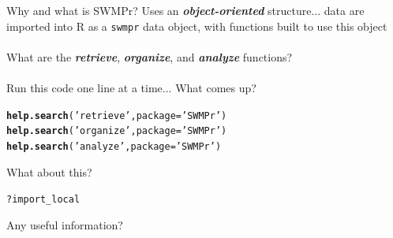 \documentclass[xcolor=dvipsnames]{beamer}\usepackage[]{graphicx}\usepackage[]{color}
\makeatletter
\newcommand{\hlstr}[1]{\textcolor[rgb]{0.192,0.494,0.8}{#1}}%
\newcommand{\hlopt}[1]{\textcolor[rgb]{0,0,0}{#1}}%
\newcommand{\hlstd}[1]{\textcolor[rgb]{0.345,0.345,0.345}{#1}}%
\newcommand{\hlkwc}[1]{\textcolor[rgb]{0.333,0.667,0.333}{#1}}%
\newcommand{\hlkwd}[1]{\textcolor[rgb]{0.737,0.353,0.396}{\textbf{#1}}}%
\newenvironment{kframe}{%
 \def\at@end@of@kframe{}%
 \ifinner\ifhmode%
  \def\at@end@of@kframe{\end{minipage}}%
  \begin{minipage}{\columnwidth}%
 \fi\fi%
 \def\FrameCommand##1{\hskip\@totalleftmargin \hskip-\fboxsep
 \colorbox{shadecolor}{##1}\hskip-\fboxsep
     \hskip-\linewidth \hskip-\@totalleftmargin \hskip\columnwidth}%
 \MakeFramed {\advance\hsize-\width
   \@totalleftmargin\z@ \linewidth\hsize
   \@setminipage}}%
 {\par\unskip\endMakeFramed%
 \at@end@of@kframe}
\newenvironment{knitrout}{}{} %
\newcommand{\Bigtxt}[1]{\textbf{\textit{#1}}}
\makeatother
\begin{document}
\begin{frame}[fragile]{Why and what is SWMPr?}
\onslide<+->
Uses an \Bigtxt{object-oriented} structure... data are imported into R as a \texttt{swmpr} data object, with functions built to use this object\\~\\
What are the \Bigtxt{retrieve}, \Bigtxt{organize}, and \Bigtxt{analyze} functions? \\~\\
Run this code one line at a time... What comes up?
\begin{knitrout}\scriptsize
{}\color{fgcolor}\begin{kframe}
\begin{alltt}
\hlkwd{help.search}\hlstd{(}\hlstr{'retrieve'}\hlstd{,} \hlkwc{package} \hlstd{=} \hlstr{'SWMPr'}\hlstd{)}
\hlkwd{help.search}\hlstd{(}\hlstr{'organize'}\hlstd{,} \hlkwc{package} \hlstd{=} \hlstr{'SWMPr'}\hlstd{)}
\hlkwd{help.search}\hlstd{(}\hlstr{'analyze'}\hlstd{,} \hlkwc{package} \hlstd{=} \hlstr{'SWMPr'}\hlstd{)}
\end{alltt}
\end{kframe}
\end{knitrout}
\onslide<+->
What about this?
\begin{knitrout}\scriptsize
{}\color{fgcolor}\begin{kframe}
\begin{alltt}
\hlopt{?}\hlstd{import_local}
\end{alltt}
\end{kframe}
\end{knitrout}
Any useful information?
\end{frame}
\end{document}
